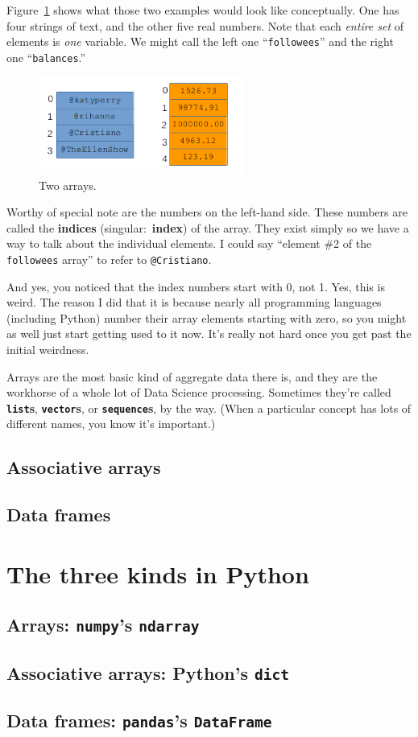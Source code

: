 Figure~\ref{fig:array} shows what those two examples would look like
conceptually. One has four strings of text, and the other five real numbers.
Note that each \textit{entire set} of elements is \textit{one} variable. We
might call the left one ``\texttt{followees}'' and the right one
``\texttt{balances}.''

\begin{figure}[ht]
\centering
\includegraphics[width=0.6\textwidth]{array.png}
\caption{Two arrays.}
\label{fig:array}
\end{figure}

Worthy of special note are the numbers on the left-hand side. These numbers
are called the \textbf{indices} (singular:~\textbf{index}) of the array.
They exist simply so we have a way to talk about the individual elements. I
could say ``element \#2 of the \texttt{followees} array'' to refer to
\texttt{@Cristiano}.

And yes, you noticed that the index numbers start with 0, not 1. Yes, this is
weird. The reason I did that it is because nearly all programming languages
(including Python) number their array elements starting with zero, so you might
as well just start getting used to it now. It's really not hard once you get
past the initial weirdness.

Arrays are the most basic kind of aggregate data there is, and they are the
workhorse of a whole lot of Data Science processing. Sometimes they're called
\textbf{\texttt{list}s}, \textbf{\texttt{vector}s}, or
\textbf{\texttt{sequence}s}, by the way. (When a particular concept has lots of
different names, you know it's important.)

\subsection{Associative arrays}

\subsection{Data frames}

\section{The three kinds in Python}

\subsection{Arrays: \texttt{numpy}'s \texttt{ndarray}}

\subsection{Associative arrays: Python's \texttt{dict}}

\subsection{Data frames: \texttt{pandas}'s \texttt{DataFrame}}


